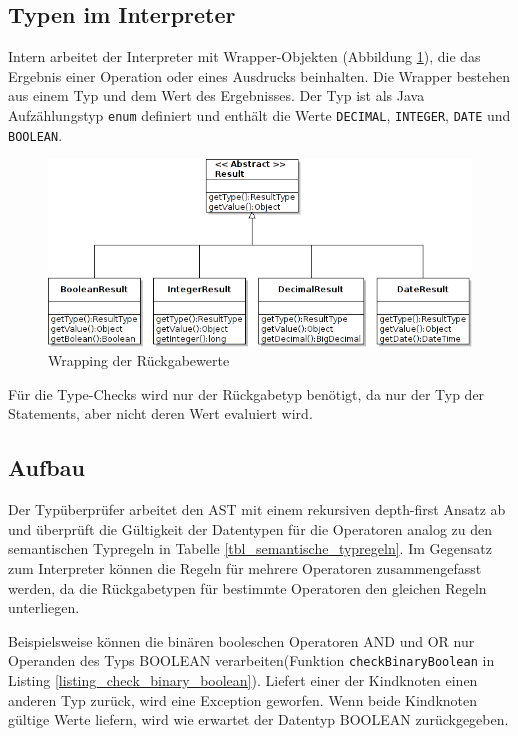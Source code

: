 \subsection{Typen im Interpreter}

Intern arbeitet der Interpreter mit Wrapper-Objekten (Abbildung \ref{figure_result_wrapper}), die das Ergebnis einer Operation oder eines Ausdrucks beinhalten. Die Wrapper bestehen aus einem Typ und dem Wert des Ergebnisses. Der Typ ist als Java Aufzählungstyp \texttt{enum} definiert und enthält die Werte \texttt{DECIMAL}, \texttt{INTEGER}, \texttt{DATE} und \texttt{BOOLEAN}.

\begin{figure}[h]
\begin{center}
\includegraphics[scale=0.5]{figures/uml_result_classes_neu}
\end{center}

\caption{Wrapping der Rückgabewerte}

\label{figure_result_wrapper}
\end{figure}

Für die Type-Checks wird nur der Rückgabetyp benötigt, da nur der Typ der Statements, aber nicht deren Wert evaluiert wird.


\subsection{Aufbau}

Der Typüberprüfer arbeitet den AST mit einem rekursiven depth-first Ansatz ab und überprüft die Gültigkeit der Datentypen für die Operatoren analog zu den semantischen Typregeln in Tabelle \ref{tbl_semantische_typregeln}. Im Gegensatz zum Interpreter können die Regeln für mehrere Operatoren zusammengefasst werden, da die Rückgabetypen für bestimmte Operatoren den gleichen Regeln unterliegen. 

Beispielsweise können die binären booleschen Operatoren AND und OR nur Operanden des Typs BOOLEAN verarbeiten(Funktion \texttt{checkBinaryBoolean} in Listing \ref{listing_check_binary_boolean}). Liefert einer der Kindknoten einen anderen Typ zurück, wird eine Exception geworfen. Wenn beide Kindknoten gültige Werte liefern, wird wie erwartet der Datentyp BOOLEAN zurückgegeben.

